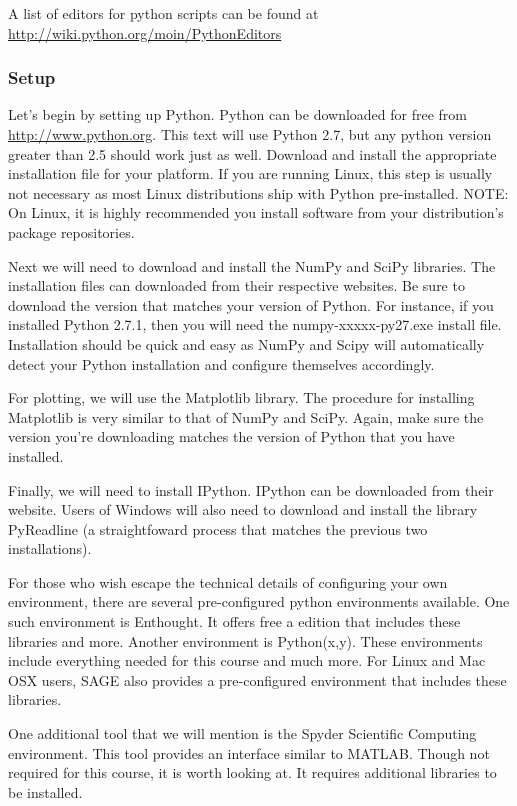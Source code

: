 A list of editors for python scripts can be found at \url{http://wiki.python.org/moin/PythonEditors}

\subsubsection*{Setup}
Let's begin by setting up Python.  Python can be downloaded for free from \url{http://www.python.org}.  This text will use Python 2.7, but any python version greater than 2.5 should work just as well.  Download and install the appropriate installation file for your platform.  If you are running Linux, this step is usually not necessary as most Linux distributions ship with Python pre-installed.  NOTE: On Linux, it is highly recommended you install software from your distribution's package repositories.

Next we will need to download and install the NumPy and SciPy libraries.  The installation files can downloaded from their respective websites.  Be sure to download the version that matches your version of Python.  For instance, if you installed Python 2.7.1, then you will need the numpy-xxxxx-py27.exe install file.  Installation should be quick and easy as NumPy and Scipy will automatically detect your Python installation and configure themselves accordingly.

For plotting, we will use the Matplotlib library.  The procedure for installing Matplotlib is very similar to that of NumPy and SciPy.  Again, make sure the version you're downloading matches the version of Python that you have installed.

Finally, we will need to install IPython.  IPython can be downloaded from their website.  Users of Windows will also need to download and install the library PyReadline (a straightfoward process that matches the previous two installations).

For those who wish escape the technical details of configuring your own environment, there are several pre-configured python environments available.  One such environment is Enthought.  It offers free a edition that includes these libraries and more.  Another environment is Python(x,y).  These environments include everything needed for this course and much more.  For Linux and Mac OSX users, SAGE also provides a pre-configured environment that includes these libraries.

One additional tool that we will mention is the Spyder Scientific Computing environment.  This tool provides an interface similar to MATLAB.  Though not required for this course, it is worth looking at.  It requires additional libraries to be installed.

